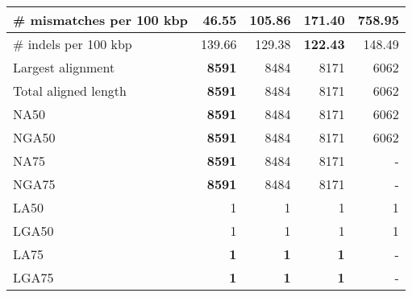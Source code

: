 \documentclass[12pt,a4paper]{article}
\begin{document}
\begin{table}[ht]
\begin{center}
\begin{tabular}{|l*{4}{|r}|}
\# mismatches per 100 kbp & {\bf 46.55} & 105.86 & 171.40 & 758.95 \\ \hline
\# indels per 100 kbp & 139.66 & 129.38 & {\bf 122.43} & 148.49 \\ \hline
Largest alignment & {\bf 8591} & 8484 & 8171 & 6062 \\ \hline
Total aligned length & {\bf 8591} & 8484 & 8171 & 6062 \\ \hline
NA50 & {\bf 8591} & 8484 & 8171 & 6062 \\ \hline
NGA50 & {\bf 8591} & 8484 & 8171 & 6062 \\ \hline
NA75 & {\bf 8591} & 8484 & 8171 & - \\ \hline
NGA75 & {\bf 8591} & 8484 & 8171 & - \\ \hline
LA50 & 1 & 1 & 1 & 1 \\ \hline
LGA50 & 1 & 1 & 1 & 1 \\ \hline
LA75 & {\bf 1} & {\bf 1} & {\bf 1} & - \\ \hline
LGA75 & {\bf 1} & {\bf 1} & {\bf 1} & - \\ \hline
\end{tabular}
\end{center}
\end{table}
\end{document}
